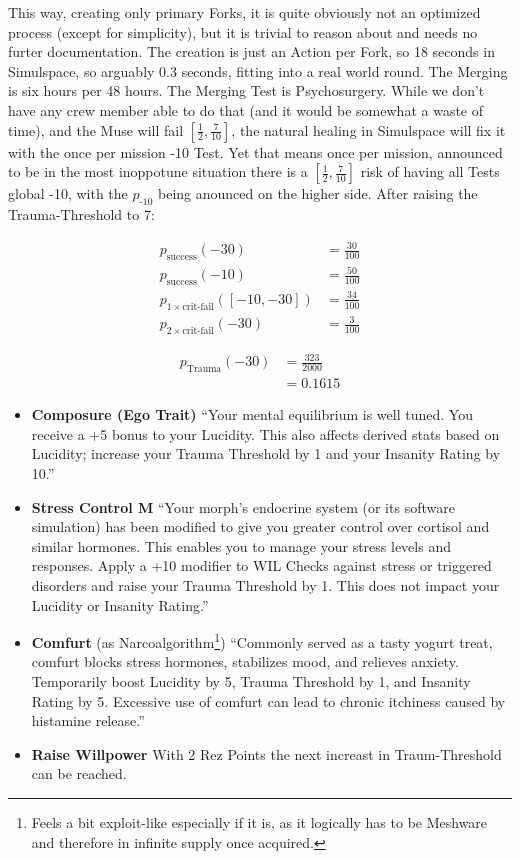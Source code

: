 This way, creating only primary \glspl{Fork}, it is quite obviously not an optimized process (except for simplicity), but it is trivial to reason about and needs no furter documentation. The creation is just an Action per \gls{Fork}, so 18 seconds in Simulspace, so arguably 0.3 seconds, fitting into a real world round. The Merging is six hours per 48 hours. The Merging Test is Psychosurgery. While we don't have any crew member able to do that (and it would be somewhat a waste of time), and the Muse will fail $\left[\frac{1}{2}, \frac{7}{10}\right]$, the natural healing in Simulspace will fix it with the once per mission -10 Test. Yet that means once per mission, announced to be in the most inoppotune situation there is a $\left[\frac{1}{2}, \frac{7}{10}\right]$ risk of having all Tests global -10, with the $p_{\text{-10}}$ being anounced on the higher side. After raising the Trauma-Threshold to 7:

\begin{align}
    p_{\text{success}}(-30) &= \frac{30}{100} \\
    p_{\text{success}}(-10) &= \frac{50}{100} \\
    p_{1 \times \text{crit-fail}}(\left[-10,-30\right]) &= \frac{34}{100} \\
    p_{2 \times \text{crit-fail}}(-30) &= \frac{3}{100}
\end{align}

\begin{align}
    p_{\text{Trauma}}(-30) &= \frac{323}{2000} \\
    &= 0.1615
\end{align}

\begin{itemize}
    \item \textbf{\gls{Composure} (Ego Trait)} “Your mental equilibrium is well tuned. You receive a +5 bonus to your Lucidity. This also affects derived stats based on Lucidity; increase your Trauma Threshold by 1 and your Insanity Rating by 10.” \citep[pg. 73]{ep2e_1.1_2019}
    \item \textbf{Stress Control M} “Your morph’s endocrine system (or its software simulation) has been modified to give you greater control over cortisol and similar hormones. This enables you to manage your stress levels and responses. Apply a +10 modifier to WIL Checks against stress or triggered disorders and raise your Trauma Threshold by 1. This does not impact your Lucidity or Insanity Rating.” \citep[pg. 323]{ep2e_1.1_2019}
    \item \textbf{Comfurt} (as Narcoalgorithm\footnote{Feels a bit exploit-like especially if it is, as it logically has to be Meshware and therefore in infinite supply once acquired.}) “Commonly served as a tasty yogurt treat, comfurt blocks stress hormones, stabilizes mood, and relieves anxiety. Temporarily boost Lucidity by 5, Trauma Threshold by 1, and Insanity Rating by 5. Excessive use of comfurt can lead to chronic itchiness caused by histamine release.” \citep[pg. 332]{ep2e_1.1_2019}
    \item \textbf{Raise Willpower} With 2 Rez Points the next increast in Traum-Threshold can be reached.
\end{itemize}

